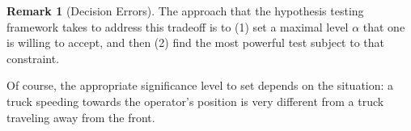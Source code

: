 \documentclass[10pt]{article}
\theoremstyle{definition}
\newtheorem{remark}[theorem]{Remark}
\newcommand{\1}[1]{\textbf{1}_{\left[#1\right]}} %
\def\P{\mathbb{P}} %
\begin{document}
\begin{remark}[Decision Errors]
  The approach that the hypothesis testing framework takes to address this
  tradeoff is to (1) set a maximal level $\alpha$ that one is willing to
  accept, and then (2) find the most powerful test subject to that constraint.

  Of course, the appropriate significance level to set depends on the
  situation: a truck speeding towards the operator's position is very
  different from a truck traveling away from the front.
\end{remark}




\end{document}
